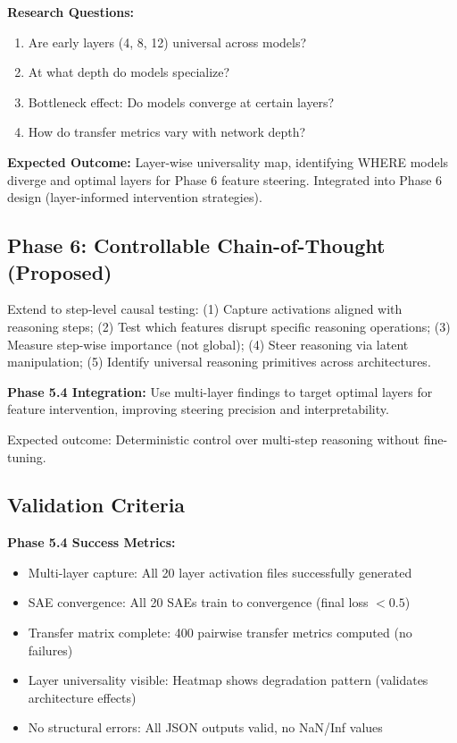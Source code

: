 \documentclass{article}
\begin{document}
\textbf{Research Questions:}
\begin{enumerate}
  \item Are early layers (4, 8, 12) universal across models?
  \item At what depth do models specialize?
  \item Bottleneck effect: Do models converge at certain layers?
  \item How do transfer metrics vary with network depth?
\end{enumerate}

\textbf{Expected Outcome:} Layer-wise universality map, identifying WHERE models diverge and optimal layers for Phase 6 feature steering. Integrated into Phase 6 design (layer-informed intervention strategies).

\subsection{Phase 6: Controllable Chain-of-Thought (Proposed)}
Extend to step-level causal testing: (1) Capture activations aligned with reasoning steps; (2) Test which features disrupt specific reasoning operations; (3) Measure step-wise importance (not global); (4) Steer reasoning via latent manipulation; (5) Identify universal reasoning primitives across architectures. 

\textbf{Phase 5.4 Integration:} Use multi-layer findings to target optimal layers for feature intervention, improving steering precision and interpretability.

Expected outcome: Deterministic control over multi-step reasoning without fine-tuning.

\subsection{Validation Criteria}

\textbf{Phase 5.4 Success Metrics:}
\begin{itemize}
  \item Multi-layer capture: All 20 layer activation files successfully generated
  \item SAE convergence: All 20 SAEs train to convergence (final loss $< 0.5$)
  \item Transfer matrix complete: 400 pairwise transfer metrics computed (no failures)
  \item Layer universality visible: Heatmap shows degradation pattern (validates architecture effects)
  \item No structural errors: All JSON outputs valid, no NaN/Inf values
\end{itemize}
\end{document}
